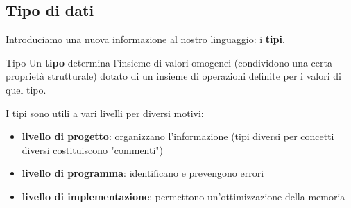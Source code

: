 \subsection{Tipo di dati}
Introduciamo una nuova informazione al nostro linguaggio: i \textbf{tipi}.

\begin{mydef}{Tipo}
    Un \textbf{tipo} determina l'insieme di valori omogenei (condividono una certa proprietà strutturale) dotato di un insieme di operazioni definite per i valori di quel tipo.
\end{mydef}

\begin{minipage}[t]{0.45\textwidth}
\end{minipage}
\hfill
\begin{minipage}[t]{0.45\textwidth}
\end{minipage}

I tipi sono utili a vari livelli per diversi motivi:
\begin{itemize}[label=$\triangleright$, itemsep=\medskipamount]
    \item \textbf{livello di progetto}: organizzano l'informazione (tipi diversi per concetti diversi costituiscono "commenti")
    \item \textbf{livello di programma}: identificano e prevengono errori
    \item \textbf{livello di implementazione}: permettono un'ottimizzazione della memoria
\end{itemize}

